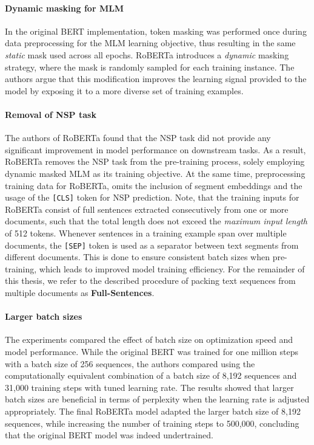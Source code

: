 \paragraph{Dynamic masking for MLM} In the original BERT implementation, token
masking was performed once during data preprocessing for the MLM learning
objective, thus resulting in the same \textit{static} mask used across all
epochs. RoBERTa introduces a \textit{dynamic} masking strategy, where the mask
is randomly sampled for each training instance. The authors argue that this
modification improves the learning signal provided to the model by exposing it
to a more diverse set of training examples.

\paragraph{Removal of NSP task} The authors of RoBERTa found that the NSP task
did not provide any significant improvement in model performance on downstream
tasks. As a result, RoBERTa removes the NSP task from the pre-training process,
solely employing dynamic masked MLM as its training objective. At the same time,
preprocessing training data for RoBERTa, omits the inclusion of segment
embeddings and the usage of the \texttt{[CLS]} token for NSP prediction. Note,
that the training inputs for RoBERTa consist of full sentences extracted
consecutively from one or more documents, such that the total length does not
exceed the \textit{maximum input length} of 512 tokens. Whenever sentences in a
training example span over multiple documents, the \texttt{[SEP]} token is used
as a separator between text segments from different documents. This is done to
ensure consistent batch sizes when pre-training, which leads to improved model
training efficiency. For the remainder of this thesis, we refer to the described
procedure of packing text sequences from multiple documents as
\textbf{Full-Sentences}.

\paragraph{Larger batch sizes} The experiments compared the effect of batch size
on optimization speed and model performance. While the original BERT was trained
for one million steps with a batch size of 256 sequences, the authors compared
using the computationally equivalent combination of a batch size of 8,192
sequences and 31,000 training steps with tuned learning rate. The results showed
that larger batch sizes are beneficial in terms of perplexity when the learning
rate is adjusted appropriately. The final RoBERTa model adapted the larger batch
size of 8,192 sequences, while increasing the number of training steps to
500,000, concluding that the original BERT model was indeed undertrained.

